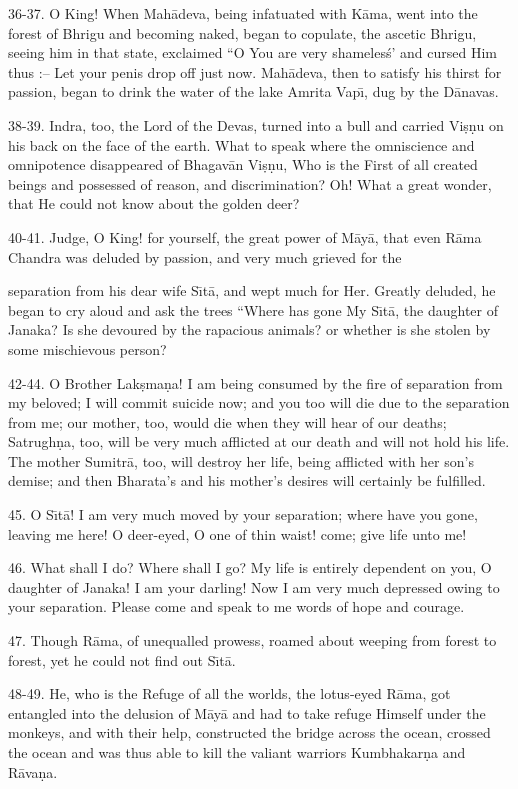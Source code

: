 36-37. O King! When Mah\=adeva, being infatuated with K\=ama, went into the forest of Bhrigu and becoming naked, began to copulate, the ascetic Bhrigu, seeing him in that state, exclaimed ``O You are very shameles\'s' and cursed Him thus :-- Let your penis drop off just now. Mah\=adeva, then to satisfy his thirst for passion, began to drink the water of the lake Amrita Vap\={\i}, dug by the D\=anavas.

38-39. Indra, too, the Lord of the Devas, turned into a bull and carried Vi\d{s}\d{n}u on his back on the face of the earth. What to speak where the omniscience and omnipotence disappeared of Bhagav\=an Vi\d{s}\d{n}u, Who is the First of all created beings and possessed of reason, and discrimination? Oh! What a great wonder, that He could not know about the golden deer?

40-41. Judge, O King! for yourself, the great power of M\=ay\=a, that even R\=ama Chandra was deluded by passion, and very much grieved for the

separation from his dear wife S\={\i}t\=a, and wept much for Her. Greatly deluded, he began to cry aloud and ask the trees ``Where has gone My S\={\i}t\=a, the daughter of Janaka? Is she devoured by the rapacious animals? or whether is she stolen by some mischievous person?

42-44. O Brother Lak\d{s}ma\d{n}a! I am being consumed by the fire of separation from my beloved; I will commit suicide now; and you too will die due to the separation from me; our mother, too, would die when they will hear of our deaths; Satrugh\d{n}a, too, will be very much afflicted at our death and will not hold his life. The mother Sumitr\=a, too, will destroy her life, being afflicted with her son's demise; and then Bharata's and his mother's desires will certainly be fulfilled.

45. O S\={\i}t\=a! I am very much moved by your separation; where have you gone, leaving me here! O deer-eyed, O one of thin waist! come; give life unto me!

46. What shall I do? Where shall I go? My life is entirely dependent on you, O daughter of Janaka! I am your darling! Now I am very much depressed owing to your separation. Please come and speak to me words of hope and courage.

47. Though R\=ama, of unequalled prowess, roamed about weeping from forest to forest, yet he could not find out S\={\i}t\=a.

48-49. He, who is the Refuge of all the worlds, the lotus-eyed R\=ama, got entangled into the delusion of M\=ay\=a and had to take refuge Himself under the monkeys, and with their help, constructed the bridge across the ocean, crossed the ocean and was thus able to kill the valiant warriors Kumbhakar\d{n}a and R\=ava\d{n}a.

